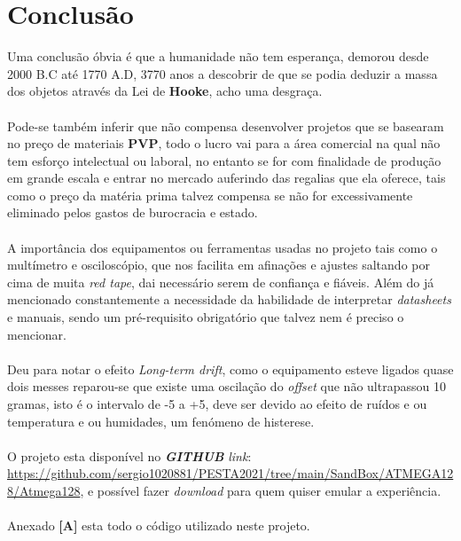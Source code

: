 \chapter{Conclusão}
Uma conclusão óbvia é que a humanidade não tem esperança, demorou desde 2000 B.C até 1770 A.D, 3770 anos a descobrir de que se podia deduzir a massa dos objetos através da Lei de \textbf{Hooke}, acho uma desgraça.
\\
\\
Pode-se também inferir que não compensa desenvolver projetos que se basearam no preço de materiais \textbf{PVP}, todo o lucro vai para a área comercial na qual não tem esforço intelectual ou laboral, no entanto se for com finalidade de produção em grande escala e entrar no mercado auferindo das regalias que ela oferece, tais como o preço da matéria prima talvez compensa se não for excessivamente eliminado pelos gastos de burocracia e estado.
\\
\\
A importância dos equipamentos ou ferramentas usadas no projeto tais como o multímetro e osciloscópio, que nos facilita em afinações e ajustes saltando por cima de muita \textit{red tape}, dai necessário serem de confiança e fiáveis. Além do já mencionado constantemente a necessidade da habilidade de interpretar \textit{datasheets} e manuais, sendo um pré-requisito obrigatório que talvez nem é preciso o mencionar.
\\
\\
Deu para notar o efeito \textit{Long-term drift}, como o equipamento esteve ligados quase dois messes reparou-se que existe uma oscilação do \textit{offset} que não ultrapassou 10 gramas, isto é o intervalo de -5 a +5, deve ser devido ao efeito de ruídos e ou temperatura e ou humidades, um fenómeno de histerese.
\\
\\
O projeto esta disponível no \textit{\textbf{GITHUB}} \textit{link}: \url{https://github.com/sergio1020881/PESTA2021/tree/main/SandBox/ATMEGA128/Atmega128}, e possível fazer \textit{download} para quem quiser emular a experiência.
\\
\\
Anexado \textbf{[A]} esta todo o código utilizado neste projeto.
\begin{comment}
Sensitivity,Long-Term Drift e Temperature Effects (Span temperature hysteresis).
\end{comment}
